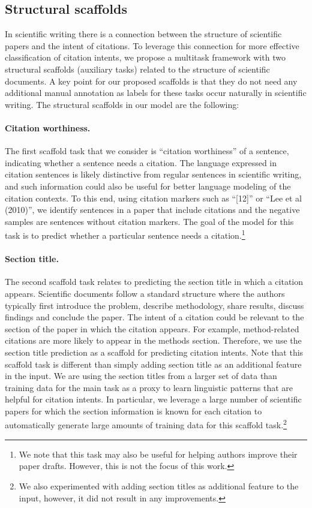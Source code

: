 \documentclass[11pt,a4paper]{article}
\begin{document}
\subsection{Structural scaffolds}
\label{subsec:mtl}



In scientific writing there is a connection between the structure of scientific papers and the intent of citations.
To leverage this connection for more effective classification of citation intents, we propose a multitask framework with two structural scaffolds (auxiliary tasks) related to the structure of scientific documents. A key point for our proposed scaffolds is that they do not need any additional manual annotation as labels for these tasks occur naturally in scientific writing. The structural scaffolds in our model are the following:


\paragraph{Citation worthiness.}
The first scaffold task that we consider is ``citation worthiness'' of a sentence, indicating whether a sentence needs a citation. The language expressed in citation sentences is likely distinctive from regular sentences in scientific writing, and such information could also be useful for better language modeling of the citation contexts.
To this end, using citation markers such as ``[12]'' or ``Lee et al (2010)'', we identify sentences in a paper that include citations and the negative samples are sentences without citation markers.
The goal of the model for this task is to predict whether a particular sentence needs a citation.\footnote{We note that this task may also be useful for helping authors improve their paper drafts. However, this is not the focus of this work.}

\paragraph{Section title.}

The second scaffold task relates to predicting the section title in which a citation appears. Scientific documents follow a standard structure where the authors typically first introduce the problem, describe methodology, share results, discuss findings and conclude the paper. The intent of a citation could be relevant to the section of the paper in which the citation appears. For example, method-related citations are more likely to appear in the methods section. Therefore, we use the section title prediction as a scaffold for predicting citation intents.
Note that this scaffold task is different than simply adding section title as an additional feature in the input. We are using the section titles from a larger set of data than training data for the main task as a proxy to learn linguistic patterns that are helpful for citation intents.
In particular, we leverage a large number of scientific papers for which the section information is known for each citation to automatically generate large amounts of training data for this scaffold task.\footnote{We also experimented with adding section titles as additional feature to the input, however, it did not result in any improvements.}
\end{document}
